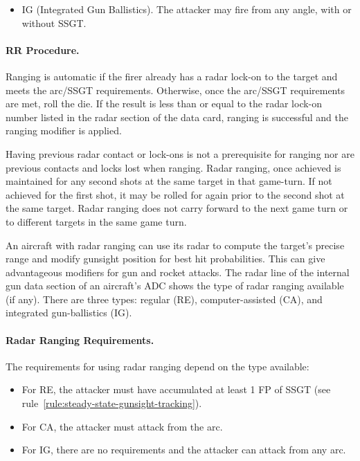 \begin{advancedrules}
{\begin{itemize}
\item IG (Integrated Gun Ballistics). The attacker may fire from any angle, with or without SSGT.

\end{itemize}

\paragraph{RR Procedure.} Ranging is automatic if the firer already has a radar lock-on to the target and meets the arc/SSGT requirements. Otherwise, once the arc/SSGT requirements are met, roll the die. If the result is less than or equal to the radar lock-on number listed in the radar section of the data card, ranging is successful and the ranging modifier is applied.

Having previous radar contact or lock-ons is not a prerequisite for ranging nor are previous contacts and locks lost when ranging. Radar ranging, once achieved is maintained for any second shots at the same target in that game-turn. If not achieved for the first shot, it may be rolled for again prior to the second shot at the same target. Radar ranging does not carry forward to the next game turn or to different targets in the same game turn.
}{

An aircraft with radar ranging can use its radar to compute the target's precise range and modify gunsight position for best hit probabilities. This can give advantageous modifiers for gun and rocket attacks. The radar line of the internal gun data section of an aircraft's ADC shows the type of radar ranging available (if any). There are three types: regular (RE), computer-assisted (CA), and integrated gun-ballistics (IG).

\paragraph{Radar Ranging Requirements.} The requirements for using radar ranging depend on the type available:

\begin{itemize}

\item For RE, the attacker must have accumulated at least 1 FP of SSGT (see rule~\ref{rule:steady-state-gunsight-tracking}).

\item For CA, the attacker must attack from the  arc.

\item For IG, there are no requirements and the attacker can attack from any arc.


\end{itemize}}
\end{advancedrules}
